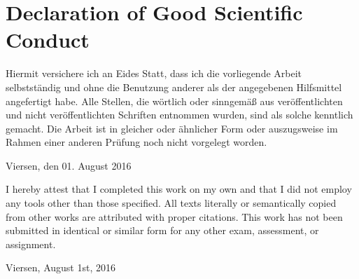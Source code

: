 \section*{Declaration of Good Scientific Conduct}

Hiermit versichere ich an Eides Statt, dass ich die vorliegende Arbeit selbstständig und ohne die Benutzung anderer als der angegebenen Hilfsmittel angefertigt habe. 
Alle Stellen, die wörtlich oder sinngemäß aus veröffentlichten und nicht veröffentlichten Schriften entnommen wurden, sind als solche kenntlich gemacht. 
Die Arbeit ist in gleicher oder ähnlicher Form oder auszugsweise im Rahmen einer anderen Prüfung noch nicht vorgelegt worden.
\vspace{15mm}
\begin{flushleft}
    Viersen, den 01. August 2016
\end{flushleft}
\vspace{30mm}
I hereby attest that I completed this work on my own and that I did not employ any tools other than those specified. 
All texts literally or semantically copied from other works are attributed with proper citations. 
This work has not been submitted in identical or similar form for any other exam, assessment, or assignment.
\vspace{15mm}
\begin{flushleft}
    Viersen, August 1st, 2016
\end{flushleft}
	